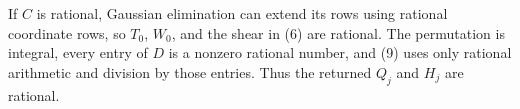 If \(C\) is rational, Gaussian elimination can extend its rows using rational coordinate rows, so \(T_0\), \(W_0\), and the shear in (6) are rational. The permutation is integral, every entry of \(D\) is a nonzero rational number, and (9) uses only rational arithmetic and division by those entries. Thus the returned \(Q_j\) and \(H_j\) are rational.